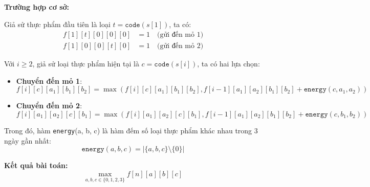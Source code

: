 \textbf{Trường hợp cơ sở:}

Giả sử thực phẩm đầu tiên là loại $t = \texttt{code}(s[1])$, ta có:
\begin{align*}
f[1][t][0][0][0] &= 1 \quad \text{(gửi đến mỏ 1)} \\
f[1][0][0][t][0] &= 1 \quad \text{(gửi đến mỏ 2)}
\end{align*}

Với $i \geq 2$, giả sử loại thực phẩm hiện tại là $c = \texttt{code}(s[i])$, ta có hai lựa chọn:

\begin{itemize}
    \item \textbf{Chuyển đến mỏ 1}:
    \[
    f[i][c][a_1][b_1][b_2] = \max(f[i][c][a_1][b_1][b_2], f[i - 1][a_1][a_2][b_1][b_2] + \texttt{energy}(c, a_1, a_2))
    \]

    \item \textbf{Chuyển đến mỏ 2}:
    \[
    f[i][a_1][a_2][c][b_1] = \max(f[i][a_1][a_2][c][b_1], f[i - 1][a_1][a_2][b_1][b_2] + \texttt{energy}(c, b_1, b_2))
    \]
\end{itemize}

Trong đó, hàm \texttt{energy}(a, b, c) là hàm đếm số loại thực phẩm khác nhau trong 3 ngày gần nhất:
\[
\texttt{energy}(a, b, c) = \left| \{a, b, c\} \setminus \{0\} \right|
\]


\textbf{Kết quả bài toán:} 
\[
\max_{a,b,c \in \{0,1,2,3\}} f[n][a][b][c]
\]

